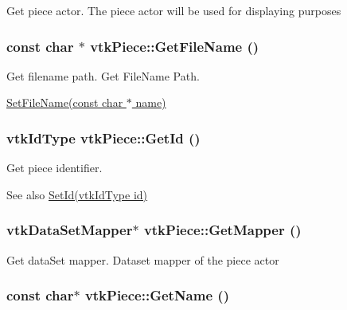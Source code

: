 Get piece actor. The piece actor will be used for displaying purposes \hypertarget{classvtkPiece_a1a91d9507576694b80da93c1ce7c3861}{
\subsubsection[{GetFileName}]{\setlength{\rightskip}{0pt plus 5cm}const char $\ast$ vtkPiece::GetFileName ()}}
\label{classvtkPiece_a1a91d9507576694b80da93c1ce7c3861}


Get filename path. Get FileName Path.

\hyperlink{classvtkPiece_a6bd1ffdbd75747966f41c7dfee8f8b4d}{SetFileName(const char $\ast$ name)} \hypertarget{classvtkPiece_a2c1faf03ee84364ed939a330d58ab2a6}{
\subsubsection[{GetId}]{\setlength{\rightskip}{0pt plus 5cm}vtkIdType vtkPiece::GetId ()}}
\label{classvtkPiece_a2c1faf03ee84364ed939a330d58ab2a6}


Get piece identifier. \begin{DoxySeeAlso}{See also}
\hyperlink{classvtkPiece_a077a58755fe796f485c25e3ecda1e994}{SetId(vtkIdType id)} 
\end{DoxySeeAlso}
\hypertarget{classvtkPiece_aca0100088140d579b1391f7ad5a557ec}{
\subsubsection[{GetMapper}]{\setlength{\rightskip}{0pt plus 5cm}vtkDataSetMapper$\ast$ vtkPiece::GetMapper ()}}
\label{classvtkPiece_aca0100088140d579b1391f7ad5a557ec}


Get dataSet mapper. Dataset mapper of the piece actor \hypertarget{classvtkPiece_aaaf5a6463ed77fff3a6ece4612db0e13}{
\subsubsection[{GetName}]{\setlength{\rightskip}{0pt plus 5cm}const char$\ast$ vtkPiece::GetName ()}}
\label{classvtkPiece_aaaf5a6463ed77fff3a6ece4612db0e13}


